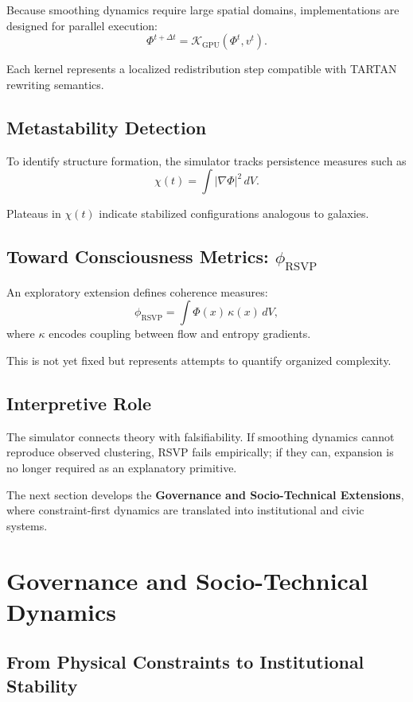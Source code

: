 \documentclass[12pt]{article}
\begin{document}
Because smoothing dynamics require large spatial domains, implementations are designed for parallel execution:
\[
\Phi^{t+\Delta t} = \mathcal{K}_{\text{GPU}}(\Phi^t,v^t).
\]

Each kernel represents a localized redistribution step compatible with TARTAN rewriting semantics.

\subsection{Metastability Detection}

To identify structure formation, the simulator tracks persistence measures such as
\[
\chi(t)=\int |\nabla\Phi|^2\,dV.
\]

Plateaus in $\chi(t)$ indicate stabilized configurations analogous to galaxies.

\subsection{Toward Consciousness Metrics: $\phi_{\text{RSVP}}$}

An exploratory extension defines coherence measures:
\[
\phi_{\text{RSVP}} = \int \Phi(x)\,\kappa(x)\,dV,
\]
where $\kappa$ encodes coupling between flow and entropy gradients.

This is not yet fixed but represents attempts to quantify organized complexity.

\subsection{Interpretive Role}

The simulator connects theory with falsifiability. If smoothing dynamics cannot reproduce observed clustering, RSVP fails empirically; if they can, expansion is no longer required as an explanatory primitive.

\bigskip

The next section develops the \textbf{Governance and Socio-Technical Extensions}, where constraint-first dynamics are translated into institutional and civic systems.

\section{Governance and Socio-Technical Dynamics}

\subsection{From Physical Constraints to Institutional Stability}
\end{document}
